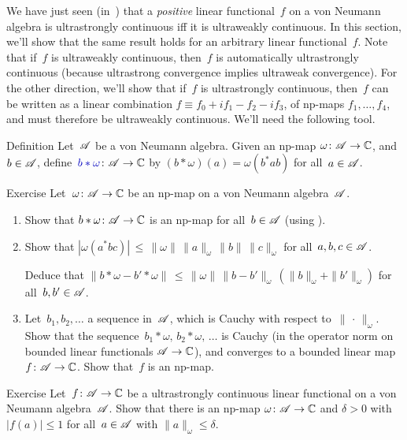 \documentclass[a]{subfiles}
\begin{document}
\begin{parsec}%
\begin{point}%
	We have just seen (in~)
	that a \emph{positive} linear functional~$f$
on a von Neumann algebra 
is ultrastrongly continuous iff it is ultraweakly continuous.
In this section, we'll show that the same result holds
for an arbitrary linear functional~$f$.
Note that if~$f$ is ultraweakly continuous,
then~$f$ is automatically ultrastrongly continuous
(because ultrastrong convergence implies ultraweak convergence).
For the other direction,
we'll show that if~$f$ is ultrastrongly continuous,
then~$f$ can be written as a linear combination
$f\equiv f_0+if_1-f_2-if_3$,
of np-maps $f_1,\dotsc,f_4$,
and must therefore be ultraweakly continuous.
We'll need the following tool.
\end{point}
\begin{point}[bstaromega]{Definition}%
Let~$\mathscr{A}$ be a von Neumann algebra.
Given an np-map $\omega\colon \mathscr{A}\to\mathbb{C}$,
and~$b\in \mathscr{A}$,
define~$\Define{b*\omega}\colon \scrA\to \C$ by
$(b*\omega)(a)=\omega(b^*ab)$ for all~$a\in \mathscr{A}$.
\end{point}
\begin{point}{Exercise}%
Let~$\omega\colon \mathscr{A}\to \mathbb{C}$ be an np-map on a von Neumann algebra~$\mathscr{A}$.
\begin{enumerate}
\item
Show that $b*\omega\colon \mathscr{A}\to\mathbb{C}$
is an np-map for all~$b\in \mathscr{A}$
(using \TODO{}).
\item
Show that $\left|\omega(a^*bc)\right| 
\,\leq\, \|\omega\|\,\|a\|_\omega\, \|b\|\, \|c\|_\omega$
for all~$a,b,c\in\mathscr{A}$.

Deduce that $\| b*\omega - b'*\omega\|
\,\leq\, \|\omega\| \,\|b-b'\|_\omega\, (\|b\|_\omega + \|b'\|_\omega)$
for all~$b,b'\in\mathscr{A}$.

\item
Let~$b_1,b_2,\dotsc$  a sequence in~$\mathscr{A}$,
which is Cauchy with respect to~$\|\,\cdot\,\|_\omega$.
Show that the sequence~$b_1*\omega,\,b_2*\omega,\,\dotsc$ 
is Cauchy (in the operator norm
on bounded linear functionals $\mathscr{A}\to\mathbb{C}$),
and converges to a bounded linear map~$f\colon \mathscr{A}\to\mathbb{C}$.
Show that~$f$ is an np-map.
\end{enumerate}
\end{point}
\begin{point}{Exercise}%
Let~$f\colon \mathscr{A}\to \mathbb{C}$ be a ultrastrongly continuous linear
functional on a von Neumann algebra~$\mathscr{A}$.
Show that there is an np-map
$\omega\colon \mathscr{A}\to \mathbb{C}$
and $\delta>0$
with $\left|f(a)\right|\leq 1$
for all~$a\in\mathscr{A}$ with $\|a\|_\omega \leq \delta$.


\end{point}
\end{parsec}
\end{document}
